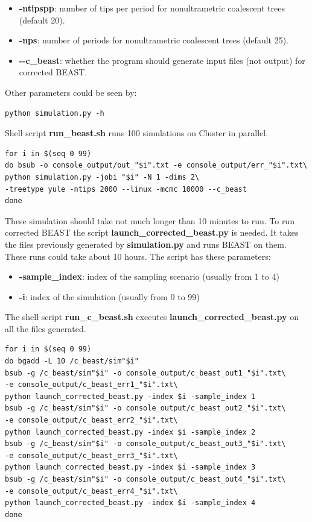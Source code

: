 \begin{itemize}
\item \textbf{-ntipspp}: number of tips per period for nonultrametric coalescent trees (default 20).

\item \textbf{-nps}: number of periods for nonultrametric coalescent trees (default 25).

\item \textbf{-{}-c\_beast}: whether the program should generate input files (not output) for corrected BEAST.


\end{itemize}

Other parameters could be seen by:

\begin{verbatim}
python simulation.py -h
\end{verbatim}


Shell script \textbf{run\_beast.sh} runs 100 simulations on Cluster in parallel.
\begin{verbatim}
for i in $(seq 0 99)
do bsub -o console_output/out_"$i".txt -e console_output/err_"$i".txt\
python simulation.py -jobi "$i" -N 1 -dims 2\
-treetype yule -ntips 2000 --linux -mcmc 10000 --c_beast
done
\end{verbatim}


These simulation should take not much longer than 10 minutes to run. To run corrected BEAST the script \textbf{launch\_corrected\_beast.py} is needed. It takes the files previously generated by \textbf{simulation.py} and runs BEAST on them. These runs could take about 10 hours. The script has these parameters:

\begin{itemize}
\item \textbf{-sample\_index}: index of the sampling scenario (usually from 1 to 4)
\item \textbf{-i}: index of the simulation (usually from 0 to 99)
\end{itemize}

The shell script \textbf{run\_c\_beast.sh} executes \textbf{launch\_corrected\_beast.py} on all the files generated.
\begin{verbatim}
for i in $(seq 0 99)
do bgadd -L 10 /c_beast/sim"$i"
bsub -g /c_beast/sim"$i" -o console_output/c_beast_out1_"$i".txt\
-e console_output/c_beast_err1_"$i".txt\ 
python launch_corrected_beast.py -index $i -sample_index 1
bsub -g /c_beast/sim"$i" -o console_output/c_beast_out2_"$i".txt\
-e console_output/c_beast_err2_"$i".txt\
python launch_corrected_beast.py -index $i -sample_index 2
bsub -g /c_beast/sim"$i" -o console_output/c_beast_out3_"$i".txt\
-e console_output/c_beast_err3_"$i".txt\
python launch_corrected_beast.py -index $i -sample_index 3
bsub -g /c_beast/sim"$i" -o console_output/c_beast_out4_"$i".txt\
-e console_output/c_beast_err4_"$i".txt\
python launch_corrected_beast.py -index $i -sample_index 4
done
\end{verbatim}

